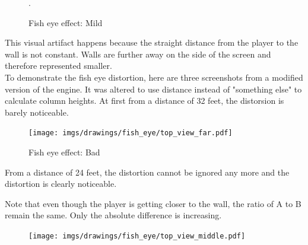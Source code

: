 \begin{minipage}{\textwidth}

    \begin{figure}[H]
    \centering
     \caption{Fish eye effect: Mild}. \label{fig:mips}
     \end{figure} 


    \begin{minipage}{.4\textwidth}
    This visual artifact happens because the straight distance from the player to the wall is not constant. Walls are further away on the side of the screen and therefore represented smaller.\\
    To demonstrate the fish eye distortion, here are three screenshots from a modified version of the engine. It was altered to use distance  instead of "something else" to calculate column heights. At first from a distance of 32 feet, the distorsion is barely noticeable.\\
     \end{minipage}
    \begin{minipage}{.6\textwidth}
    \begin{figure}[H]
      \begin{flushright}
     \texttt{[image: imgs/drawings/fish\_eye/top\_view\_far.pdf]}
       \end{flushright}
    \end{figure}
    \end{minipage}
\end{minipage}
\par



\begin{minipage}{\textwidth}
\begin{figure}[H]
\centering
 \caption{Fish eye effect: Bad} \label{fig:mips}
 \end{figure}
\begin{minipage}{.4\textwidth}
From a distance of 24 feet, the distortion cannot be ignored any more and the distortion is clearly noticeable.\\
\par
Note that even though the player is getting closer to the wall, the ratio of A to B remain the same. Only the absolute difference is increasing.
 \end{minipage}
\begin{minipage}{.6\textwidth}
\begin{figure}[H]
  \begin{flushright}
 \texttt{[image: imgs/drawings/fish\_eye/top\_view\_middle.pdf]}
 \end{flushright}
\end{figure}
\end{minipage}
\end{minipage}




